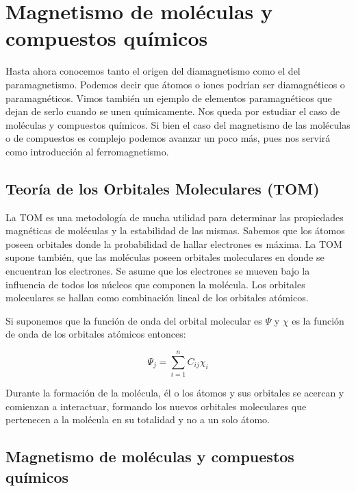 \section{Magnetismo de moléculas y compuestos químicos}

Hasta ahora conocemos tanto el origen del diamagnetismo como el del paramagnetismo. Podemos decir que átomos o iones podrían ser diamagnéticos o paramagnéticos. Vimos también un ejemplo de elementos paramagnéticos que dejan de serlo cuando se unen químicamente. Nos queda por estudiar el caso de moléculas y compuestos químicos. Si bien el caso del magnetismo de las moléculas o de compuestos es complejo podemos avanzar un poco más, pues nos servirá como introducción al ferromagnetismo.

\subsection{Teoría de los Orbitales Moleculares (TOM)}

La TOM es una metodología de mucha utilidad para determinar las propiedades magnéticas de moléculas y la estabilidad de las mismas. Sabemos que los átomos poseen orbitales donde la probabilidad de hallar electrones es máxima. La TOM supone también, que las moléculas poseen orbitales moleculares en donde se encuentran los electrones. Se asume que los electrones se mueven bajo la influencia de todos los núcleos que componen la molécula. Los orbitales moleculares se hallan como combinación lineal de los orbitales atómicos.

Si suponemos que la función de onda del orbital molecular es $\Psi$ y $\chi$ es la función de onda de los orbitales atómicos entonces:

\begin{equation}
	\Psi_{j} = \sum_{i=1}^{n}C_{ij}\chi_{i}
\end{equation}

Durante la formación de la molécula, él o los átomos y sus orbitales se acercan y comienzan a interactuar, formando los nuevos orbitales moleculares que pertenecen a la molécula en su totalidad y no a un solo átomo.

\subsection{Magnetismo de moléculas y compuestos químicos}

